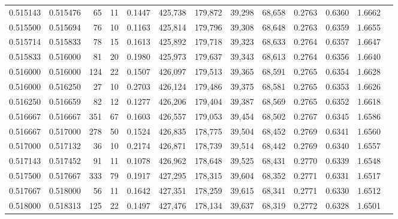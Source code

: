 \begin{tabular}{rrrrrrrrrrrrr}
0.515143 & 0.515476 &    65 &  11 &                                     0.1447 & 425,738 & 179,872 &  39,298 &  68,658 & 0.2763 & 0.6360 & 1.6662 \\
0.515500 & 0.515694 &    76 &  10 &                                     0.1163 & 425,814 & 179,796 &  39,308 &  68,648 & 0.2763 & 0.6359 & 1.6655 \\
0.515714 & 0.515833 &    78 &  15 &                                     0.1613 & 425,892 & 179,718 &  39,323 &  68,633 & 0.2764 & 0.6357 & 1.6647 \\
0.515833 & 0.516000 &    81 &  20 &                                     0.1980 & 425,973 & 179,637 &  39,343 &  68,613 & 0.2764 & 0.6356 & 1.6640 \\
0.516000 & 0.516000 &   124 &  22 &                                     0.1507 & 426,097 & 179,513 &  39,365 &  68,591 & 0.2765 & 0.6354 & 1.6628 \\
0.516000 & 0.516250 &    27 &  10 &                                     0.2703 & 426,124 & 179,486 &  39,375 &  68,581 & 0.2765 & 0.6353 & 1.6626 \\
0.516250 & 0.516659 &    82 &  12 &                                     0.1277 & 426,206 & 179,404 &  39,387 &  68,569 & 0.2765 & 0.6352 & 1.6618 \\
0.516667 & 0.516667 &   351 &  67 &                                     0.1603 & 426,557 & 179,053 &  39,454 &  68,502 & 0.2767 & 0.6345 & 1.6586 \\
0.516667 & 0.517000 &   278 &  50 &                                     0.1524 & 426,835 & 178,775 &  39,504 &  68,452 & 0.2769 & 0.6341 & 1.6560 \\
0.517000 & 0.517132 &    36 &  10 &                                     0.2174 & 426,871 & 178,739 &  39,514 &  68,442 & 0.2769 & 0.6340 & 1.6557 \\
0.517143 & 0.517452 &    91 &  11 &                                     0.1078 & 426,962 & 178,648 &  39,525 &  68,431 & 0.2770 & 0.6339 & 1.6548 \\
0.517500 & 0.517667 &   333 &  79 &                                     0.1917 & 427,295 & 178,315 &  39,604 &  68,352 & 0.2771 & 0.6331 & 1.6517 \\
0.517667 & 0.518000 &    56 &  11 &                                     0.1642 & 427,351 & 178,259 &  39,615 &  68,341 & 0.2771 & 0.6330 & 1.6512 \\
0.518000 & 0.518313 &   125 &  22 &                                     0.1497 & 427,476 & 178,134 &  39,637 &  68,319 & 0.2772 & 0.6328 & 1.6501 \\

\end{tabular}
